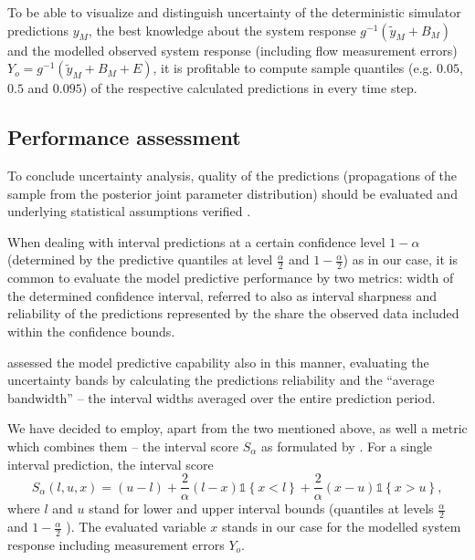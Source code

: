 \documentclass{ctuthesis}\usepackage[]{graphicx}\usepackage[]{color}
\begin{document}
To be able to visualize and distinguish uncertainty of the deterministic simulator predictions $y_M$, the best knowledge about the system response $g^{-1}(\tilde{y}_M+ B_M)$ and the modelled observed system response (including flow measurement errors) $Y_o= g^{-1}(\tilde{y}_M+ B_M + E)$, it is profitable to compute sample quantiles (e.g. $0.05$, $0.5$ and $0.095$) of the respective calculated predictions in every time step.



\subsection{Performance assessment}
To conclude uncertainty analysis, quality of the predictions (propagations of the sample from the posterior joint parameter distribution) should be evaluated and underlying statistical assumptions verified \citep{giudice2013improving}. 

When dealing with interval predictions at a certain confidence level $1-\alpha$ (determined by the predictive quantiles at level $ \frac{\alpha}{2} $ and $ 1-\frac{\alpha}{2} $) as in our case, it is common to evaluate the model predictive performance by two metrics: width of the determined confidence interval, referred to also as interval sharpness \mbox{\citep[e.g.][]{breinholt2012formal}} and reliability of the predictions represented by the share the observed data included within the confidence bounds.

\cite{giudice2013improving} assessed the model predictive capability also in this manner, evaluating the uncertainty bands  by calculating the predictions reliability and the \enquote{average bandwidth} --  the interval widths averaged over the entire prediction period.

We have decided to employ, apart from the two mentioned above,  as well a metric which combines them -- the interval score $S_\alpha$ as formulated by \cite{gneiting2007strictly}. For a single interval prediction, the interval score 
\begin{equation}
S_\alpha(l,u,x) =  ( u - l ) + \frac{2}{\alpha} (l - x)  \mathds{1} \left\{x < l \right\} + \frac{2}{\alpha} (x - u)  \mathds{1} \left\{x > u \right\} ,
\end{equation}
where $l$ and $u$ stand for lower and upper interval bounds (quantiles at levels $ \frac{\alpha}{2} $ and $ 1-\frac{\alpha}{2} $ ). The evaluated variable $x$ stands in our case for the modelled system response including measurement errors $Y_o$. 
\end{document}
